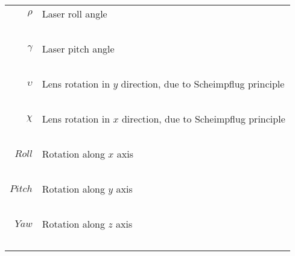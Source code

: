 \begin{longtable}{ r p{11cm} }
  $\rho$                                & Laser roll angle                                                              \\~\\ 
  $\gamma$                              & Laser pitch angle                                                             \\~\\ 
  $\upsilon$                            & Lens rotation in $y$ direction, due to Scheimpflug principle                  \\~\\ 
  $\chi$                                & Lens rotation in $x$ direction, due to Scheimpflug principle                  \\~\\ 
  $Roll$                                & Rotation along $x$ axis                                                       \\~\\ 
  $Pitch$                               & Rotation along $y$ axis                                                       \\~\\ 
  $Yaw$                                 & Rotation along $z$ axis                                                       \\~\\ 
  
\end{longtable}

